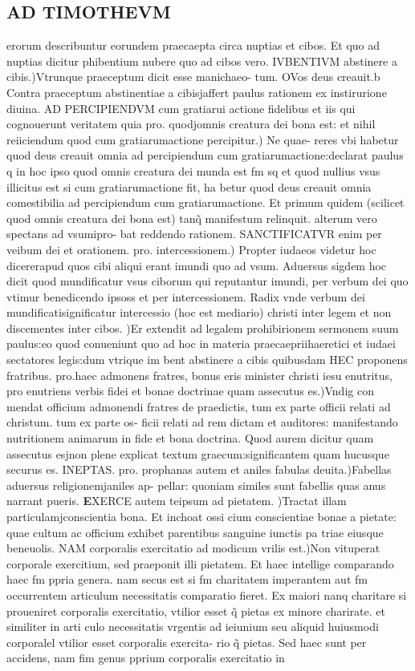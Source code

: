 \documentclass{article}
\begin{document}
\begin{pages}
\section*{AD TIMOTHEVM }\pstart erorum describuntur eorundem praecaepta circa nuptias et cibos. Et quo ad nuptias dicitur phibentium nubere quo ad cibos vero. IVBENTIVM abstinere a cibis.)Vtrunque praeceptum dicit esse manichaeo- tum. OVos deus creauit.b Contra praeceptum abstinentiae a cibisjaffert paulus rationem ex instirurione diuina. AD PERCIPIENDVM cum gratiarui actione fidelibus et iis qui cognouerunt veritatem quia pro. quodjomnis creatura dei bona est: et nihil reiiciendum quod cum gratiarumactione percipitur.) Ne quae- reres vbi habetur quod deus creauit omnia ad percipiendum cum gratiarumactione:declarat paulus q in hoc ipso quod omnis creatura dei munda est fm sq et quod nullius vsus illicitus est si cum gratiarumactione fit, ha betur quod deus creauit omnia comestibilia ad percipiendum cum gratiarumactione. Et primum quidem (scilicet quod omnis creatura dei bona est) tanq̃ manifestum relinquit. alterum vero spectans ad vsumipro- bat reddendo rationem. SANCTIFICATVR enim per veibum dei et orationem. pro. intercessionem.) Propter iudaeos videtur hoc dicererapud quos cibi aliqui erant imundi quo ad vsum. Aduersus sigdem hoc dicit quod mundificatur vsus ciborum qui reputantur imundi, per verbum dei quo vtimur benedicendo ipsoss et per intercessionem. Radix vnde verbum dei mundificatisignificatur intercessio (hoc est mediario) christi inter legem et non discementes inter cibos. )Er extendit ad legalem prohibirionem sermonem suum paulus:eo quod conueniunt quo ad hoc in materia praecaepriihaeretici et iudaei sectatores legis:dum vtrique im bent abstinere a cibis quibusdam HEC proponens fratribus. pro.haec admonens fratres, bonus eris minister christi iesu enutritus, pro enutriens verbis fidei et bonae doctrinae quam assecutus es.)Vndig con mendat officium admonendi fratres de praedictis, tum ex parte officii relati ad christum. tum ex parte os- ficii relati ad rem dictam et auditores: manifestando nutritionem animarum in fide et bona doctrina. Quod aurem dicitur quam assecutus esjnon plene explicat textum graecum:significantem quam hucusque securus es. INEPTAS. pro. prophanas autem et aniles fabulas deuita.)Fabellas aduersus religionemjaniles ap- pellar: quoniam similes sunt fabellis quas anus narrant pueris.  \pend\pstart \huge\textbf{E}\normalsize XERCE autem teipsum ad pietatem. )Tractat illam particulamjconscientia bona. Et inchoat ossi cium conscientiae bonae a pietate: quae cultum ac officium exhibet parentibus sanguine iunctis pa triae eiusque beneuolis. NAM corporalis exercitatio ad modicum vrilis est.)Non vituperat corporale exercitium, sed praeponit illi pietatem. Et haec intellige comparando haec fm ppria genera. nam secus est si fm charitatem imperantem aut fm occurrentem articulum necessitatis comparatio fieret. Ex maiori nanq charitare si proueniret corporalis exercitatio, vtilior esset q̃ pietas ex minore charirate. et similiter in arti culo necessitatis vrgentis ad ieiunium seu aliquid huiusmodi corporalel vtilior esset corporalis exercita- rio q̃ pietas. Sed haec sunt per accidens, nam fim genus pprium corporalis exercitatio in 
\end{pages}
\end{document}
